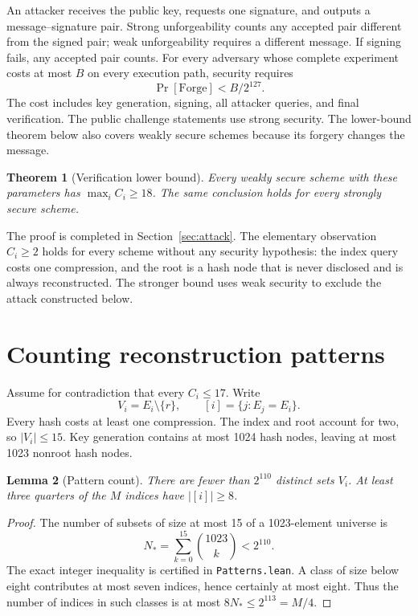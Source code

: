 \documentclass[10pt]{article}
\newtheorem{theorem}{Theorem}
\newtheorem{lemma}[theorem]{Lemma}
\begin{document}
An attacker receives the public key, requests one signature, and outputs a message--signature pair. Strong unforgeability counts any accepted pair different from the signed pair; weak unforgeability requires a different message. If signing fails, any accepted pair counts. For every adversary whose complete experiment costs at most $B$ on every execution path, security requires
\begin{equation}\label{eq:security}
\Pr[\mathrm{Forge}]<B/2^{127}.
\end{equation}
The cost includes key generation, signing, all attacker queries, and final verification. The public challenge statements use strong security. The lower-bound theorem below also covers weakly secure schemes because its forgery changes the message.

\begin{theorem}[Verification lower bound]\label{thm:main}
Every weakly secure scheme with these parameters has $\max_i C_i\ge18$. The same conclusion holds for every strongly secure scheme.
\end{theorem}

The proof is completed in Section~\ref{sec:attack}. The elementary observation $C_i\ge2$ holds for every scheme without any security hypothesis: the index query costs one compression, and the root is a hash node that is never disclosed and is always reconstructed. The stronger bound uses weak security to exclude the attack constructed below.

\section{Counting reconstruction patterns}\label{sec:patterns}

Assume for contradiction that every $C_i\le17$. Write
\[
V_i=E_i\setminus\{r\},\qquad
[i]=\{j:E_j=E_i\}.
\]
Every hash costs at least one compression. The index and root account for two, so $|V_i|\le15$. Key generation contains at most 1024 hash nodes, leaving at most 1023 nonroot hash nodes.

\begin{lemma}[Pattern count]\label{lem:patterns}
There are fewer than $2^{110}$ distinct sets $V_i$. At least three quarters of the $M$ indices have $|[i]|\ge8$.
\end{lemma}
\begin{proof}
The number of subsets of size at most 15 of a 1023-element universe is
\begin{equation}\label{eq:pattern-count}
N_* = \sum_{k=0}^{15}\binom{1023}{k}<2^{110}.
\end{equation}
The exact integer inequality is certified in \texttt{Patterns.lean}. A class of size below eight contributes at most seven indices, hence certainly at most eight. Thus the number of indices in such classes is at most $8N_*\le2^{113}=M/4$.
\end{proof}
\end{document}
